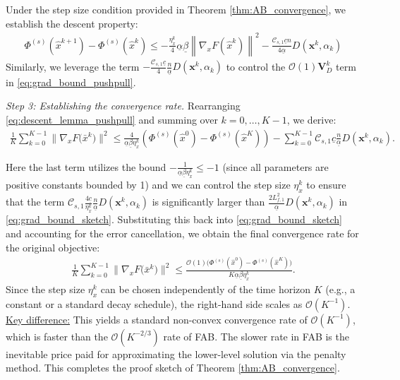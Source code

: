 \documentclass{article}
\theoremstyle{plain}
\theoremstyle{definition}
\theoremstyle{remark}
\begin{document}
Under the step size condition provided in Theorem \ref{thm:AB_convergence}, we establish the descent property:
 \begin{align}\label{eq:descent_lemma_pushpull}
       \Phi^{(s)}({\hat{x}}^{k+1}) - \Phi^{(s)}({\hat{x}}^{k}) \leq - \frac{\eta_x^{k}}{4}\underline{\alpha}\underline{\beta} \left\| \nabla_{x}F(\hat{x}^{k}) \right\|^{2} - \frac{\mathcal{C}_{s,1} \underline{c}n}{4\underline{\alpha}} D(\mathbf{x}^{k}, \alpha_{k})
    \end{align}
Similarly, we leverage the term $- \frac{\mathcal{C}_{s,1} \underline{c}}{4} \frac{n}{\underline{\alpha}} D(\mathbf{x}^{k}, \alpha_{k})$ to control the $\mathcal{O}(1) \mathbf{V}_{D}^{k}$ term in \eqref{eq:grad_bound_pushpull}.

\textit{Step 3: Establishing the convergence rate.} Rearranging \eqref{eq:descent_lemma_pushpull} and summing over $k=0, \dots, K-1$, we derive:
 \begin{align*}
        \frac{1}{K} \sum_{k=0}^{K-1}\big\|\nabla_{x} F\big({\bar{x}}^k\big) \big\|^{2} 
        \leq{}
        \frac{4}{\underline{\alpha}\underline{\beta}\eta_{x}^{k}} \left(\Phi^{(s)}({\hat{x}}^{0}) - \Phi^{(s)}({\hat{x}}^{K}) \right) 
        - \sum_{k=0}^{K-1} \mathcal{C}_{s,1} \underline{c} \frac{n}{\underline{\alpha}} D(\mathbf{x}^{k}, \alpha_{k}).
    \end{align*}

Here the last term utilizes the bound $-\frac{1}{\underline{\alpha}\underline{\beta}\eta_{x}^{k}}\leq-1$ (since all parameters are positive constants bounded by 1) and we can control the step size $\eta_{x}^{k}$ to ensure that the term $\mathcal{C}_{s,1} \frac{4\underline{c}}{\eta_{x}^{k}} \frac{n}{\underline{\alpha}}D(\mathbf{x}^{k},\alpha_{k})$ is significantly larger than $\frac{2 L_{f,1}^{2}}{\underline{\alpha}} D(\mathbf{x}^{k},\alpha_{k})$ in \eqref{eq:grad_bound_sketch}. Substituting this back into \eqref{eq:grad_bound_sketch} and accounting for the error cancellation, we obtain the final convergence rate for the original objective:
\begin{align}\label{eq:sum_descent_pushpull}
      \frac{1}{K} \sum_{k=0}^{K-1}\big\|\nabla_{x} F\big({\bar{x}}^k\big) \big\|^{2} 
        \leq \frac{\mathcal{O}(1)\big(\Phi^{(s)}({\hat{x}}^{0}) - \Phi^{(s)}({\hat{x}}^{K}) \big)}{K \underline{\alpha}\underline{\beta} \eta_{x}^{k}}.
\end{align}
Since the step size $\eta_x^k$ can be chosen independently of the time horizon $K$ (e.g., a constant or a standard decay schedule), the right-hand side scales as $\mathcal{O}(K^{-1})$.
\underline{Key difference:} This yields a standard non-convex convergence rate of \underline{$\mathcal{O}(K^{-1})$}, which is faster than the $\mathcal{O}(K^{-2/3})$ rate of FAB. The slower rate in FAB is the inevitable price paid for approximating the lower-level solution via the penalty method. This completes the proof sketch of Theorem \ref{thm:AB_convergence}.
\end{document}
